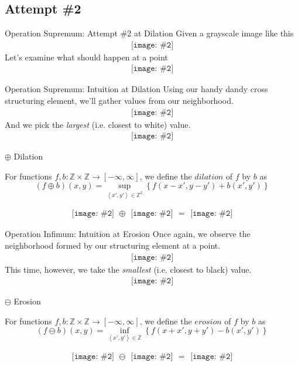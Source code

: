 \documentclass{beamer}
\newcommand{\pic}[2]{
     \begin{array}{l}
      \texttt{[image: \#2]}
      \end{array}
}
\newcommand{\set}[1]{\left\lbrace #1 \right\rbrace}
\newcommand{\tuple}[1]{\left\langle #1 \right\rangle}
\newcommand{\integers}{\mathbb{Z}}
\newcommand{\dilate}{\oplus}
\newcommand{\erode}{\ominus}
\begin{document}
\subsection{Attempt \#2}

\begin{frame}{Operation Supremum: Attempt \#2 at Dilation}
  Given a grayscale image like this
  $$\pic{width=50pt}{images/grayscale_tiles.png}$$  
  Let's examine what should happen at a point
  $$\pic{width=50pt}{images/grayscale_tiles_point.png}$$
\end{frame}

\begin{frame}{Operation Supremum: Intuition at Dilation}
  Using our handy dandy cross structuring element, we'll gather values from
  our neighborhood.
  $$\pic{width=50pt}{images/grayscale_tiles_neighborhood.png}$$  
  And we pick the \emph{largest} (i.e. closest to white) value.
  $$\pic{width=50pt}{images/grayscale_tiles_point_replacement.png}$$
\end{frame}

\begin{frame}{$\dilate$ Dilation}
\begin{definition}
  For functions $f,b: \mathbb{Z}\times\mathbb{Z}\rightarrow [-\infty,\infty]$,
  we define the $dilation$ of $f$ by $b$ as
  $$(f \dilate b)(x,y) = \displaystyle\sup_{\tuple{x',y'} \in \integers^2}
                                      \set{f(x-x',y-y') + b(x',y')}$$
\end{definition}
  $$\pic{width=50pt}{images/grayscale_tiles.png}
    \dilate \pic{width=50pt}{images/cross_inverted.png}
     = \pic{width=50pt}{images/grayscale_tiles_dilated.png}$$
\end{frame}

\begin{frame}{Operation Infimum: Intuition at Erosion}
  Once again, we observe the neighborhood formed by our structuring element
  at a point.
  $$\pic{width=50pt}{images/grayscale_tiles_neighborhood2.png}$$
  This time, however, we take the \emph{smallest} (i.e. closest to black)
  value.
  $$\pic{width=50pt}{images/grayscale_tiles_point_replacement2.png}$$
\end{frame}

\begin{frame}{$\erode$ Erosion}
\begin{definition}
  For functions $f,b: \mathbb{Z}\times\mathbb{Z}\rightarrow [-\infty,\infty]$,
  we define the $erosion$ of $f$ by $b$ as
  $$(f \erode b)(x,y) = \displaystyle\inf_{\tuple{x',y'} \in \mathbb{Z}}
                                      \set{f(x+x',y+y') - b(x',y')}$$
\end{definition}
$$\pic{width=50pt}{images/grayscale_tiles.png}
  \erode \pic{width=50pt}{images/cross_inverted.png}
  = \pic{width=50pt}{images/grayscale_tiles_eroded.png}$$
\end{frame}
\end{document}
